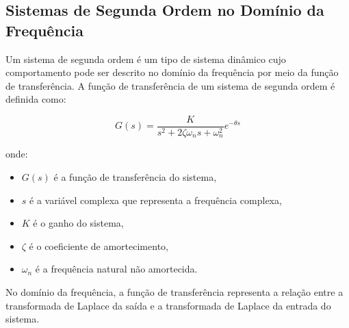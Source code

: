 \documentclass[a4paper,12pt]{article}
\begin{document}

    \subsection{Sistemas de Segunda Ordem no Domínio da Frequência}

    Um sistema de segunda ordem é um tipo de sistema dinâmico cujo comportamento pode ser descrito no domínio da frequência por meio da função de transferência. A função de transferência de um sistema de segunda ordem é definida como:

    \begin{equation*}
        G(s) = \frac{K}{s^2 + 2\zeta\omega_ns + \omega_n^2} e^{-\theta s} \tag{2.3.1}
    \end{equation*}
    
    onde:
    \begin{itemize}
        \item $G(s)$ é a função de transferência do sistema,
        \item $s$ é a variável complexa que representa a frequência complexa,
        \item $K$ é o ganho do sistema,
        \item $\zeta$ é o coeficiente de amortecimento,
        \item $\omega_n$ é a frequência natural não amortecida.
    \end{itemize}

    No domínio da frequência, a função de transferência representa a relação entre a transformada de Laplace da saída e a transformada de Laplace da entrada do sistema.
    
\end{document}
